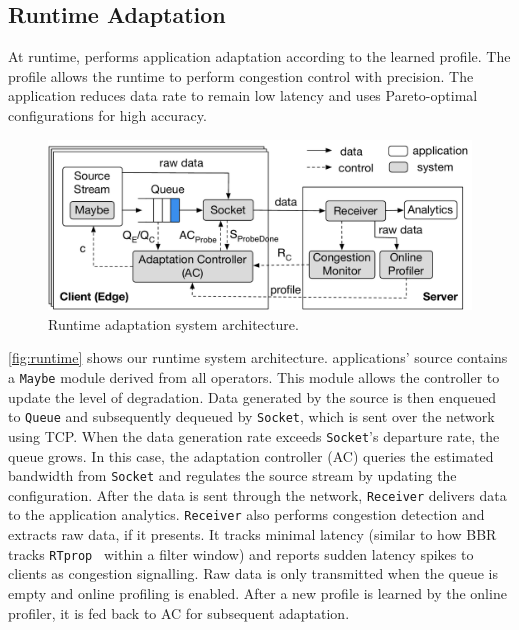 \subsection{Runtime Adaptation}
\label{sec:runtime}

At runtime, \sysname{} performs application adaptation according to the learned
profile. The profile allows the runtime to perform congestion control with
precision. The application reduces data rate to remain low latency and uses
Pareto-optimal configurations for high accuracy.

\begin{figure}
  \centering
  \includegraphics[width=\linewidth]{figures/runtime-adaptation.pdf}
  \caption{Runtime adaptation system architecture.}
  \label{fig:runtime}
\end{figure}

\autoref{fig:runtime} shows our runtime system architecture. \sysname{}
applications' source contains a \texttt{Maybe} module derived from all \maybe{}
operators. This module allows the controller to update the level of
degradation. Data generated by the source is then enqueued to \texttt{Queue} and
subsequently dequeued by \texttt{Socket}, which is sent over the network using
TCP. When the data generation rate exceeds \texttt{Socket}'s departure rate, the
queue grows. In this case, the adaptation controller (AC) queries the estimated
bandwidth from \texttt{Socket} and regulates the source stream by updating the
configuration. After the data is sent through the network, \texttt{Receiver}
delivers data to the application analytics. \texttt{Receiver} also performs
congestion detection and extracts raw data, if it presents.  It tracks minimal
latency (similar to how BBR tracks \texttt{RTprop}~\cite{cardwell2017bbr} within
a filter window) and reports sudden latency spikes to clients as congestion
signalling. Raw data is only transmitted when the queue is empty and online
profiling is enabled. After a new profile is learned by the online profiler, it
is fed back to AC for subsequent adaptation.


